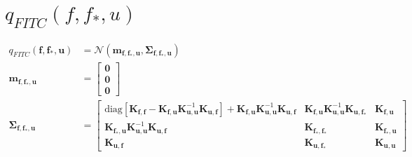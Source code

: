 \documentclass[12pt, landscape]{article}
\begin{document}
\section{$q_{FITC}(f,f_{*},u)$}
\begingroup\makeatletter{}\check@mathfonts
\def\maketag@@@#1{\hbox{\m@th\large\normalfont#1}}
\begin{align*}
q_{FITC}\left(\mathbf{f},\mathbf{f_{*}},\mathbf{u}\right)&= \mathcal{N}\left(\mathbf{m}_{\mathbf{f},\mathbf{f_{*}},\mathbf{u}},\mathbf{\Sigma}_{\mathbf{f},\mathbf{f_{*}},\mathbf{u}}\right)\\
\mathbf{m}_{\mathbf{f},\mathbf{f_{*}},\mathbf{u}} &= \left[\begin{smallmatrix}\mathbf{0}\\\mathbf{0}\\\mathbf{0}\end{smallmatrix}\right]\\
\mathbf{\Sigma}_{\mathbf{f},\mathbf{f_{*}},\mathbf{u}} &= \left[\begin{smallmatrix}\text{diag}[\mathbf{K}_{\mathbf{f},\mathbf{f}} - \mathbf{K}_{\mathbf{f},\mathbf{u}} \mathbf{K}_{\mathbf{u},\mathbf{u}}^{-1} \mathbf{K}_{\mathbf{u},\mathbf{f}}] + \mathbf{K}_{\mathbf{f},\mathbf{u}} \mathbf{K}_{\mathbf{u},\mathbf{u}}^{-1} \mathbf{K}_{\mathbf{u},\mathbf{f}}&\mathbf{K}_{\mathbf{f},\mathbf{u}} \mathbf{K}_{\mathbf{u},\mathbf{u}}^{-1} \mathbf{K}_{\mathbf{u},\mathbf{f_{*}}}&\mathbf{K}_{\mathbf{f},\mathbf{u}}\\\mathbf{K}_{\mathbf{f_{*}},\mathbf{u}} \mathbf{K}_{\mathbf{u},\mathbf{u}}^{-1} \mathbf{K}_{\mathbf{u},\mathbf{f}}&\mathbf{K}_{\mathbf{f_{*}},\mathbf{f_{*}}}&\mathbf{K}_{\mathbf{f_{*}},\mathbf{u}}\\\mathbf{K}_{\mathbf{u},\mathbf{f}}&\mathbf{K}_{\mathbf{u},\mathbf{f_{*}}}&\mathbf{K}_{\mathbf{u},\mathbf{u}}\end{smallmatrix}\right]\\
\end{align*}\endgroup
\end{document}
